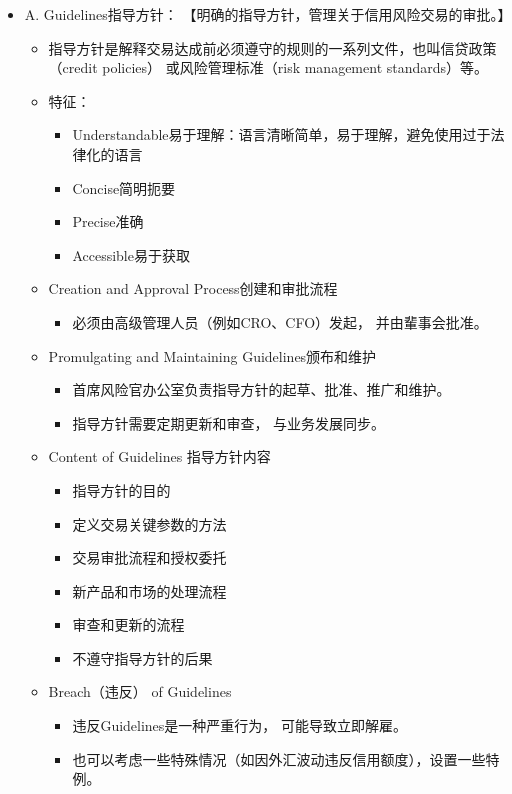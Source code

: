 \begin{itemize}
\item A. Guidelines指导方针： 【明确的指导方针，管理关于信用风险交易的审批。】
    \begin{itemize}
    \item 指导方针是解释交易达成前必须遵守的规则的一系列文件，也叫信贷政策（credit policies） 或风险管理标准（risk management standards）等。
    \item 特征：
        \begin{itemize}
        \item Understandable易于理解：语言清晰简单，易于理解，避免使用过于法律化的语言
        \item Concise简明扼要
        \item Precise准确
        \item Accessible易于获取
        \end{itemize}
    \item Creation and Approval Process创建和审批流程
        \begin{itemize}
        \item 必须由高级管理人员（例如CRO、CFO）发起， 并由輩事会批准。
        \end{itemize}
    \item Promulgating and Maintaining Guidelines颁布和维护
        \begin{itemize}
        \item 首席风险官办公室负责指导方针的起草、批准、推广和维护。
        \item  指导方针需要定期更新和审查， 与业务发展同步。
        \end{itemize}
    \item Content of Guidelines 指导方针内容
        \begin{itemize}
        \item 指导方针的目的
        \item 定义交易关键参数的方法
        \item 交易审批流程和授权委托
        \item 新产品和市场的处理流程
        \item 审查和更新的流程
        \item 不遵守指导方针的后果
        \end{itemize}
    \item Breach（违反） of Guidelines
        \begin{itemize}
        \item 违反Guidelines是一种严重行为， 可能导致立即解雇。
        \item 也可以考虑一些特殊情况（如因外汇波动违反信用额度），设置一些特例。
        \end{itemize}
    \end{itemize}


\end{itemize}

